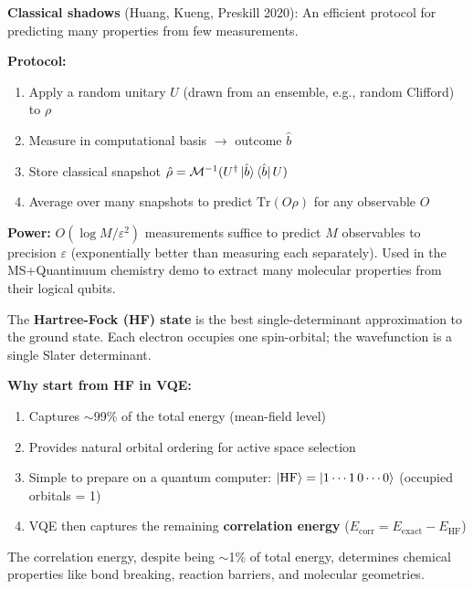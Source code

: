 \documentclass[11pt,a4paper]{article}
\begin{document}
\begin{answerbox}
\textbf{Classical shadows} (Huang, Kueng, Preskill 2020): An efficient protocol for predicting many properties from few measurements.

\textbf{Protocol:}
\begin{enumerate}
    \item Apply a random unitary $U$ (drawn from an ensemble, e.g., random Clifford) to $\rho$
    \item Measure in computational basis $\to$ outcome $\hat{b}$
    \item Store classical snapshot $\hat{\rho} = \mathcal{M}^{-1}(U^\dagger \ket{\hat{b}}\bra{\hat{b}} U)$
    \item Average over many snapshots to predict $\text{Tr}(O\rho)$ for any observable $O$
\end{enumerate}
\textbf{Power:} $O(\log M / \varepsilon^2)$ measurements suffice to predict $M$ observables to precision $\varepsilon$ (exponentially better than measuring each separately). Used in the MS+Quantinuum chemistry demo to extract many molecular properties from their logical qubits.
\end{answerbox}

\begin{answerbox}
The \textbf{Hartree-Fock (HF) state} is the best single-determinant approximation to the ground state. Each electron occupies one spin-orbital; the wavefunction is a single Slater determinant.

\textbf{Why start from HF in VQE:}
\begin{enumerate}
    \item Captures $\sim$99\% of the total energy (mean-field level)
    \item Provides natural orbital ordering for active space selection
    \item Simple to prepare on a quantum computer: $\ket{\text{HF}} = \ket{1\cdots 1\, 0\cdots 0}$ (occupied orbitals = 1)
    \item VQE then captures the remaining \textbf{correlation energy} ($E_{\text{corr}} = E_{\text{exact}} - E_{\text{HF}}$)
\end{enumerate}
The correlation energy, despite being $\sim$1\% of total energy, determines chemical properties like bond breaking, reaction barriers, and molecular geometries.
\end{answerbox}
\end{document}
